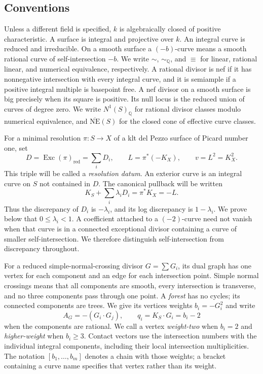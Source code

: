 \documentclass[11pt,reqno]{amsart}
\theoremstyle{definition}
\theoremstyle{remark}
\DeclareMathOperator{\Exc}{Exc}
\newcommand{\QQ}{\mathbb Q}
\numberwithin{equation}{section}
\begin{document}
\subsection{Conventions}
Unless a different field is specified, $k$ is algebraically closed of
positive characteristic. A surface is integral and projective over $k$.
An integral curve is reduced and irreducible. On a smooth surface a
$(-b)$-curve means a smooth rational curve of self-intersection $-b$.
We write $\sim$, $\sim_{\QQ}$, and $\equiv$ for linear, rational linear,
and numerical equivalence, respectively. A rational divisor is nef if
it has nonnegative intersection with every integral curve, and it is
semiample if a positive integral multiple is basepoint free. A nef
divisor on a smooth surface is big precisely when its square is
positive. Its null locus is the reduced union of curves of degree zero.
We write $N^1(S)_{\QQ}$ for rational divisor classes modulo numerical
equivalence, and $\overline{\mathrm{NE}}(S)$ for the closed cone of
effective curve classes.

For a minimal resolution $\pi:S\to X$ of a klt del Pezzo surface of
Picard number one, set
\[
 D=\Exc(\pi)_{\mathrm{red}}=\sum_iD_i,\qquad
 L=\pi^*(-K_X),\qquad v=L^2=K_X^2.
\]
This triple will be called a \emph{resolution datum}. An exterior curve
is an integral curve on $S$ not contained in $D$. The canonical
pullback will be written
\[
 K_S+\sum_i\lambda_iD_i=\pi^*K_X=-L.
\]
Thus the discrepancy of $D_i$ is $-\lambda_i$, and its log discrepancy
is $1-\lambda_i$. We prove below that $0\le\lambda_i<1$.
A coefficient attached to a $(-2)$-curve need not vanish when that
curve is in a connected exceptional divisor containing a curve of
smaller self-intersection. We therefore distinguish self-intersection
from discrepancy throughout.

For a reduced simple-normal-crossing divisor $G=\sum G_i$, its dual
graph has one vertex for each component and an edge for each
intersection point. Simple normal crossings means that all components
are smooth, every intersection is transverse, and no three components
pass through one point. A \emph{forest} has no cycles; its connected
components are trees. We give its vertices weights $b_i=-G_i^2$ and
write
\[
 A_G=-(G_i\cdot G_j),\qquad q_i=K_S\cdot G_i=b_i-2
\]
when the components are rational. We call a vertex \emph{weight-two}
when $b_i=2$ and \emph{higher-weight} when $b_i\ge3$. Contact vectors
use the intersection numbers with the individual integral components,
including their local intersection multiplicities. The notation
$[b_1,\ldots,b_m]$ denotes a chain with those weights; a bracket
containing a curve name specifies that vertex rather than its weight.
\end{document}

